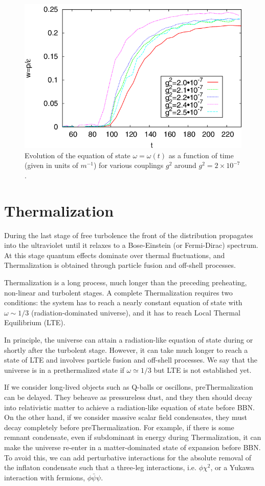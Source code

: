 \documentclass[11pt,a4paper,twoside]{book}
\begin{document}
\begin{figure}
	\centering
	\includegraphics[width=0.6\linewidth, height=0.25\textheight]{Images/Chap6/EquationOfState_fig1}
	\caption{Evolution of the equation of state $\omega =\omega (t)$ as a function of time (given in units of $ m^{-1} $) for various couplings $ g^{2} $ around $ g^{2}=2 \times 10^{-7} $ \cite{Chap7:Peloso_Thermalization}.}
	\label{fig:equationofstatefig1}
\end{figure}

\section{Thermalization}
During the last stage of free turbolence the front of the distribution propagates into the ultraviolet until it relaxes to a Bose-Einstein (or Fermi-Dirac) spectrum. At this stage quantum effects dominate over thermal fluctuations, and Thermalization is obtained through particle fusion and off-shell processes. 

Thermalization is a long process, much longer than the preceding preheating, non-linear and turbolent stages. A complete Thermalization requires two conditions: the system has to reach a nearly constant equation of state with $\omega \sim 1/3$ (radiation-dominated universe), and it has to reach Local Thermal Equilibrium (LTE).

 In principle, the universe can attain a radiation-like equation of state during or shortly after the turbolent stage. However, it can take much longer  to reach a state of LTE and involves particle fusion and off-shell processes.  We say that the universe is in a prethermalized state if $\omega \simeq 1/3$ but LTE is not established yet.
 
If we consider long-lived objects such as Q-balls or oscillons, preThermalization can be delayed. They beheave as pressureless dust,  and they then should decay into relativistic matter to achieve a radiation-like equation of state before BBN. On the other hand, if we consider  massive scalar field condensates, they must decay completely before preThermalization. For example, if there is some remnant condensate, even if subdominant in energy during Thermalization, it can make the universe re-enter in a matter-dominated  state of expansion before BBN. To avoid this, we can add perturbative interactions for the absolute removal of the inflaton condensate such that a three-leg interactions, i.e. $\phi\chi^{2}$, or a Yukawa interaction with fermions, $\phi \bar{\psi}\psi$. 
\end{document}
